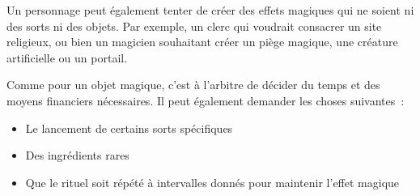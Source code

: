 Un personnage peut également tenter de créer des effets magiques qui ne
soient ni des sorts ni des objets. Par exemple, un clerc qui voudrait
consacrer un site religieux, ou bien un magicien souhaitant créer un
piège magique, une créature artificielle ou un portail.

Comme pour un objet magique, c'est à l'arbitre de décider du temps et
des moyens financiers nécessaires. Il peut également demander les choses
suivantes~:

\begin{itemize}
  \item Le lancement de certains sorts spécifiques
  \item Des ingrédients rares
  \item Que le rituel soit répété à intervalles donnés pour
  maintenir l'effet magique
\end{itemize}